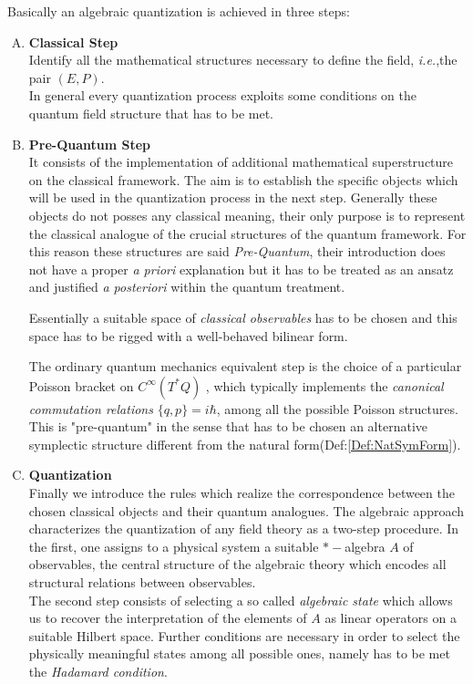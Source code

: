 \documentclass[Main]{subfiles}
\begin{document}
Basically an algebraic quantization is achieved in three steps:
\begin{enumerate}[A)]
	\item \textbf{Classical Step}\\
		Identify all the mathematical structures necessary to define the field, \textit{i.e.},the pair $(E,P)$.\\
		In general every quantization process exploits some conditions on the quantum field structure that has to be met.
	\item \textbf{Pre-Quantum Step}\\
		It consists of the implementation of additional %
		mathematical superstructure on the classical framework. The aim is to establish the specific objects which will be %
		used in the quantization process in the next step. 
		Generally these objects do not posses any classical meaning, their only purpose is to represent the classical analogue of the crucial structures of the quantum framework. 
		For this reason these structures are said \emph{Pre-Quantum}, their introduction does not have a proper \emph{a priori} explanation but it has to be treated as an ansatz and justified \emph{a posteriori} within the quantum treatment.
		
		Essentially a suitable space of \emph{classical observables} has to be chosen and this space has to be rigged with a well-behaved bilinear form.
		
		The ordinary quantum mechanics equivalent step is the choice of a particular Poisson bracket on $C^\infty(T^*Q)$ , which typically implements the \emph{canonical commutation relations} $\{q,p\}=i\hbar$, among all the possible Poisson structures. 
		This is "pre-quantum" in the sense that has to be chosen an alternative symplectic structure different from the natural form(Def:\ref{Def:NatSymForm}).
		
		
	\item \textbf{Quantization}\\
		Finally we introduce the rules which realize the correspondence between the chosen classical objects and their quantum analogues.
		The algebraic approach characterizes the quantization of any field theory as a two-step procedure. 
		In the first, one assigns to a physical system a suitable $\ast-$algebra $A$ of observables, the central structure of the algebraic theory which encodes all structural relations between observables.\\
		The second step consists of selecting a so called \emph{algebraic state} which allows us to recover the interpretation of the elements of $A$ as linear operators on a suitable Hilbert space.
		Further conditions are necessary in order to select the physically meaningful states among all possible ones, namely has to be met the \emph{Hadamard condition}.
		
		
\end{enumerate}
\end{document}
